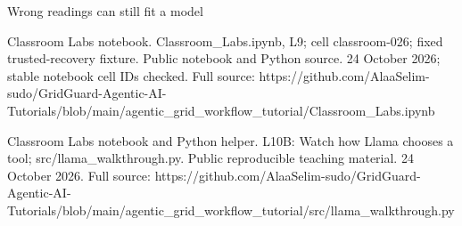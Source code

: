 \begin{frame}[t]{Wrong readings can still fit a model}
{Classroom Labs notebook. Classroom\_Labs.ipynb, L9; cell classroom-026; fixed trusted-recovery fixture. Public notebook and Python source. 24 October 2026; stable notebook cell IDs checked.
Full source: https://github.c\allowbreak{}om/AlaaSelim-sud\allowbreak{}o/GridGuard-Agen\allowbreak{}tic-AI-Tutorials\allowbreak{}/blob/main/agent\allowbreak{}ic\_grid\_workflow\allowbreak{}\_tutorial/Classr\allowbreak{}oom\_Labs.ipynb

Classroom Labs notebook and Python helper. L10B: Watch how Llama chooses a tool; src/llama\_walkthrough.py. Public reproducible teaching material. 24 October 2026.
Full source: https://github.c\allowbreak{}om/AlaaSelim-sud\allowbreak{}o/GridGuard-Agen\allowbreak{}tic-AI-Tutorials\allowbreak{}/blob/main/agent\allowbreak{}ic\_grid\_workflow\allowbreak{}\_tutorial/src/ll\allowbreak{}ama\_walkthrough.\allowbreak{}py}
\end{frame}

